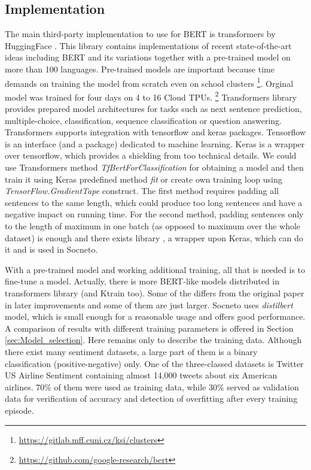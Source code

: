 \subsection{Implementation}
The main third-party implementation to use for BERT is transformers by HuggingFace \cite{Wolf2019HuggingFacesTS}.
This library contains implementations of recent state-of-the-art ideas including BERT and its variations together with a pre-trained model on more than 100 languages. Pre-trained models are important because time demands on training the model from scratch even on school clusters \footnote{\url{https://gitlab.mff.cuni.cz/ksi/clusters}}. Orginal model was trained for four days on 4 to 16 Cloud TPUs. \footnote{\url{https://github.com/google-research/bert}}
 Transformers library provides prepared model architectures for tasks such as next sentence prediction, multiple-choice, classification, sequence classification or question answering. Transformers supports integration with tensorflow and keras packages. Tensorflow \cite{tensorflow2015-whitepaper} is an interface (and a package) dedicated to machine learning. Keras \cite{chollet2015keras} is a wrapper over tensorflow, which provides a shielding from too technical details. We could use Transformers method \textit{TfBertForClassification} for obtaining a model and then train it using Keras predefined method \textit{fit} or create own training loop using \textit{TensorFlow.GradientTape} construct. The first method requires padding all sentences to the same length, which could produce too long sentences and have a negative impact on running time. For the second method, padding sentences only to the length of maximum in one batch (as opposed to maximum over the whole dataset) is enough and there exists library \textit{\cite{Ktrain}}, a wrapper upon Keras, which can do it and is used in Socneto. \par
With a pre-trained model and working additional training, all that is needed is to fine-tune a model. Actually, there is more BERT-like models distributed in transformers library (and Ktrain too). Some of the differs from the original paper in later improvements and some of them are just larger. Socneto uses \textit{distilbert} model, which is small enough for a reasonable usage and offers good performance.
A comparison of results with different training parameters is offered in Section \ref{sec:Model_selection}. Here remains only to describe the training data. Although there exist many sentiment datasets, a large part of them is a binary classification (positive-negative) only. One of the three-classed datasets is Twitter US Airline Sentiment \cite{airlines}
containing almost 14,000 tweets about six American airlines. 70\% of them were used as training data, while 30\% served as validation data for verification of accuracy and detection of overfitting after every training episode. 
